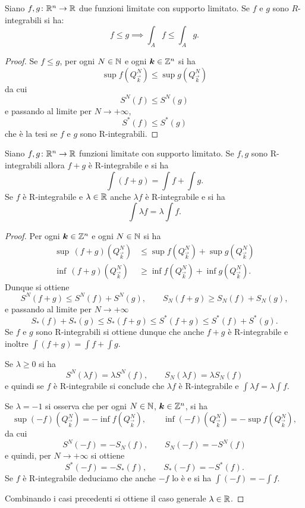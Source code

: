 \begin{theorem}
Siano $f,g\colon {\mathbb R}^n\to{\mathbb R}$ due funzioni limitate con supporto limitato.
Se $f$ e $g$ sono $R$-integrabili si ha:
\[
  f \le g \implies \int_A f \le \int_A g.
\]
\end{theorem}
%
\begin{proof}
Se $f\le g$, per ogni $N\in {\mathbb N}$ e ogni $\boldsymbol k \in {\mathbb Z}^n$ si ha 
\[
    \sup f(Q^N_{\vec k}) \le \sup g(Q^N_{\vec k}) 
\]
da cui 
\[
    S^N(f) \le S^N(g)
\]
e passando al limite per $N\to +\infty$,
\[
  S^*(f) \le S^*(g)
\]
che è la tesi se $f$ e $g$ sono R-integrabili.
\end{proof}

\begin{theorem}
Siano $f,g\colon {\mathbb R}^n \to {\mathbb R}$ funzioni limitate con supporto limitato.
Se $f,g$ sono R-integrabili allora $f+g$ è R-integrabile e si ha 
\[
    \int (f+g) = \int f + \int g.
\]
Se $f$ è R-integrabile e $\lambda\in {\mathbb R}$ anche $\lambda f$ è R-integrabile 
e si ha 
\[
    \int \lambda f = \lambda \int f.
\]
\end{theorem}
\begin{proof}
Per ogni $\boldsymbol k\in{\mathbb Z}^n$ e ogni $N\in {\mathbb N}$
si ha
\begin{align*}
  \sup\, (f+g)(Q^N_{\vec k}) &\le \sup f(Q^N_{\vec k}) + \sup g(Q^N_{\vec k})\\
  \inf\, (f+g)(Q^N_{\vec k}) &\ge \inf f(Q^N_{\vec k}) + \inf g(Q^N_{\vec k}).
\end{align*}
Dunque si ottiene
\[
    S^N(f+g) \le S^N(f) + S^N(g),  \qquad
    S_N(f+g) \ge S_N(f) + S_N(g), 
\]
e passando al limite per $N\to +\infty$ 
\[
   S_*(f) + S_*(g) \le S_*(f+g) \le S^*(f+g) \le S^*(f) + S^*(g).
\]
Se $f$ e $g$ sono R-integrabili si ottiene dunque che anche $f+g$ 
è R-integrabile e inoltre $\int (f+g) = \int f + \int g$.

Se $\lambda \ge 0$ si ha 
\[
   S^N(\lambda f) = \lambda S^N(f), \qquad S_N(\lambda f) = \lambda S_N(f)
\]
e quindi se $f$ è R-integrabile si conclude 
che $\lambda f$ è R-integrabile e $\int \lambda f = \lambda \int f$.

Se $\lambda = -1$ si osserva che per ogni $N\in {\mathbb N}$, $\boldsymbol k\in {\mathbb Z}^n$, 
si ha 
\[
   \sup (-f)(Q^N_{\vec k}) = -\inf f(Q^N_{\vec k}),
   \qquad 
   \inf (-f)(Q^N_{\vec k}) = -\sup f(Q^N_{\vec k}),
\]
da cui 
\[
    S^N(-f) = -S_N(f), \qquad S_N(-f) = -S^N(f)
\]
e quindi, per $N\to +\infty$ si ottiene 
\[
  S^*(-f) = -S_*(f), \qquad S_*(-f) = - S^*(f).
\]
Se $f$ è R-integrabile deduciamo che anche $-f$ lo è e si ha 
$\int (-f) = -\int f$.

Combinando i casi precedenti si ottiene il caso generale $\lambda \in {\mathbb R}$.
\end{proof}

